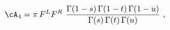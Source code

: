 \begin{equation}
\cA_4=
\pi\,F^LF^R\,
\,{\Gamma(1-s)\,\Gamma(1-t)\, \Gamma(1-u)\over\Gamma(s)\, \Gamma(t)\, 
\Gamma(u)} \ ,
\end{equation}

